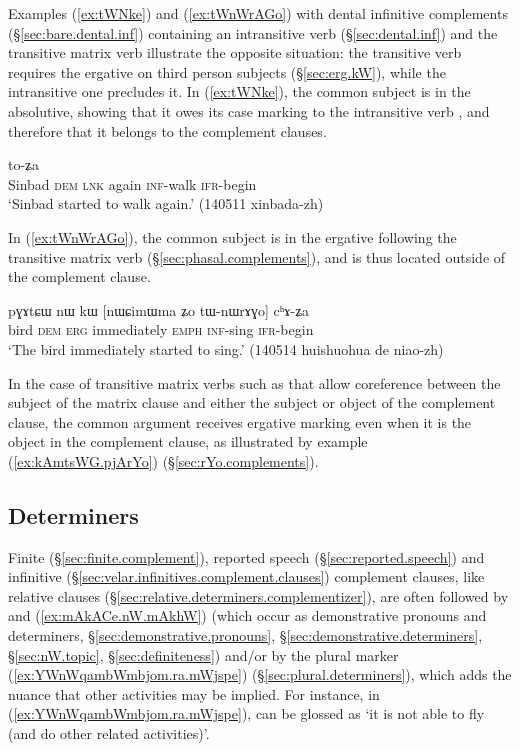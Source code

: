 Examples (\ref{ex:tWNke}) and (\ref{ex:tWnWrAGo}) with dental infinitive complements (§\ref{sec:bare.dental.inf}) containing an intransitive verb (§\ref{sec:dental.inf}) and the transitive matrix verb  illustrate the opposite situation: the transitive verb requires the ergative on third person subjects (§\ref{sec:erg.kW}), while the intransitive one precludes it. In (\ref{ex:tWNke}), the common subject is in the absolutive, showing that it owes its case marking to the intransitive verb , and therefore that it belongs to the complement clauses.

\begin{exe}
\ex \label{ex:tWNke}
 to-ʑa \\
Sinbad \textsc{dem} \textsc{lnk} again  \textsc{inf}-walk \textsc{ifr}-begin \\
\glt `Sinbad started to walk again.' (140511 xinbada-zh)
\end{exe}

In (\ref{ex:tWnWrAGo}), the common subject is in the ergative following the transitive matrix verb  (§\ref{sec:phasal.complements}), and is thus located outside of the complement clause.

\begin{exe}
\ex \label{ex:tWnWrAGo}
\gll pɣɤtɕɯ nɯ kɯ [nɯɕimɯma ʑo tɯ-nɯrɤɣo] cʰɤ-ʑa \\
bird \textsc{dem} \textsc{erg} immediately \textsc{emph} \textsc{inf}-sing \textsc{ifr}-begin \\
\glt `The bird immediately started to sing.' (140514 huishuohua de niao-zh)
\end{exe}

In the case of transitive matrix verbs such as  that allow coreference between the subject of the matrix clause and either the subject or object of the complement clause, the common argument receives ergative marking even when it is the object in the complement clause, as illustrated by example (\ref{ex:kAmtsWG.pjArYo}) (§\ref{sec:rYo.complements}).

\subsection{Determiners} \label{sec:complement.determiner}
Finite (§\ref{sec:finite.complement}), reported speech (§\ref{sec:reported.speech}) and infinitive (§\ref{sec:velar.infinitives.complement.clauses}) complement clauses, like relative clauses (§\ref{sec:relative.determiners.complementizer}), are often followed by  and  (\ref{ex:mAkACe.nW.mAkhW})  (which occur as  demonstrative pronouns and determiners, §\ref{sec:demonstrative.pronouns}, §\ref{sec:demonstrative.determiners}, §\ref{sec:nW.topic}, §\ref{sec:definiteness}) and/or by the plural marker  (\ref{ex:YWnWqambWmbjom.ra.mWjspe}) (§\ref{sec:plural.determiners}), which adds the nuance that other activities may be implied. For instance, in (\ref{ex:YWnWqambWmbjom.ra.mWjspe}),  can be glossed as `it is not able to fly (and do other related activities)'.

